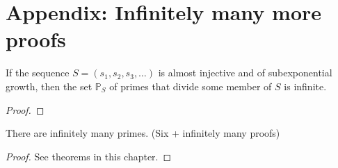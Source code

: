 \section{Appendix: Infinitely many more proofs} \label{appendix:more_primes}
\begin{theorem}
    \label{thm:infty_proof}
    \leanok
    If the sequence \(S = (s_1, s_2, s_3, \dots)\) is almost injective and of subexponential growth,
    then the set \(\mathbb{P}_S\) of primes that divide some member of $S$ is infinite.
\end{theorem}
\begin{proof}
\end{proof}

\begin{theorem}
    \label{thm:infinity_of_primes}
    There are infinitely many primes. (Six + infinitely many proofs)
    \leanok
\end{theorem}
\begin{proof}
    See theorems in this chapter.
\end{proof}
